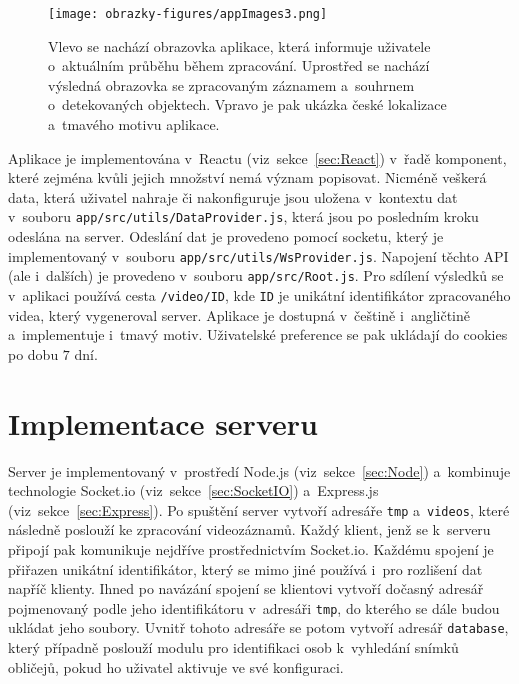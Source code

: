 \begin{figure}[hbt]
	\centering
	\setlength{\fboxsep}{0pt}
	\texttt{[image: obrazky-figures/appImages3.png]}
	\caption{Vlevo se nachází obrazovka aplikace, která informuje uživatele o~aktuálním průběhu během zpracování. Uprostřed se nachází výsledná obrazovka se zpracovaným záznamem a~souhrnem o~detekovaných objektech. Vpravo je pak ukázka české lokalizace a~tmavého motivu aplikace.}
	\label{img:appImages3}
\end{figure}

Aplikace je implementována v~Reactu (viz~sekce~\ref{sec:React}) v~řadě komponent, které zejména kvůli jejich množství nemá význam popisovat. Nicméně veškerá data, která uživatel nahraje či nakonfiguruje jsou uložena v~kontextu dat v~souboru \texttt{app/src/utils/DataProvider.js}, která jsou po posledním kroku odeslána na server. Odeslání dat je provedeno pomocí socketu, který je implementovaný v~souboru \texttt{app/src/utils/WsProvider.js}.  Napojení těchto API (ale i~dalších) je provedeno v~souboru \texttt{app/src/Root.js}. Pro sdílení výsledků se v~aplikaci používá cesta \texttt{/video/ID}, kde \texttt{ID} je unikátní identifikátor zpracovaného videa, který vygeneroval server. Aplikace je dostupná v~češtině i~angličtině a~implementuje i~tmavý motiv. Uživatelské preference se pak ukládají do cookies po dobu $7$ dní.

\section{Implementace serveru}
\label{sec:server}
Server je implementovaný v~prostředí Node.js (viz~sekce~\ref{sec:Node}) a~kombinuje technologie Socket.io (viz~sekce~\ref{sec:SocketIO}) a~Express.js (viz~sekce~\ref{sec:Express}). Po spuštění server vytvoří adresáře \texttt{tmp} a~\texttt{videos}, které následně poslouží ke zpracování videozáznamů. Každý klient, jenž se k~serveru připojí pak komunikuje nejdříve prostřednictvím Socket.io. Každému spojení je přiřazen unikátní identifikátor, který se mimo jiné používá i~pro rozlišení dat napříč klienty. Ihned po navázání spojení se klientovi vytvoří dočasný adresář pojmenovaný podle jeho identifikátoru v~adresáři \texttt{tmp}, do kterého se dále budou ukládat jeho soubory. Uvnitř tohoto adresáře se potom vytvoří adresář \texttt{database}, který případně poslouží modulu pro identifikaci osob k~vyhledání snímků obličejů, pokud ho uživatel aktivuje ve své konfiguraci.


